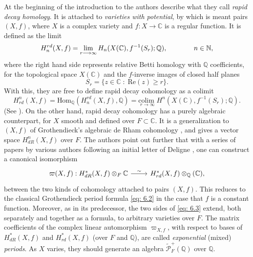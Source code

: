 \documentclass[preprint,12pt, leqno]{elsarticle}
\newcommand{\mQ}{\mathbb{Q}}
\newcommand{\mC}{\mathbb{C}}
\newcommand{\cP}{\mathcal{P}}
\newcommand{\ubf}[1]{\textit{#1}}
\newcommand{\SP}{\mkern70mu }
\numberwithin{equation}{section}
\theoremstyle{named}
\begin{document}
At the beginning of the introduction to \cite{FJ} the authors describe what they call \ubf{rapid decay homology}. It is attached to \ubf{varieties with potential}, by which is meant pairs $(X, f)$, where $X$ is a complex variety and $f:X \longrightarrow \mC$ is a regular function. It is defined as the limit
\begin{equation*}
    H_n^{rd}(X, f) = \lim_{r\longrightarrow\infty} H_n(X(\mC), f^{-1}(S_r); \mQ), \SP n\in \mathbb{N},
\end{equation*}
where the right hand side represents relative Betti homology with $\mQ$ coefficients, for the topological space $X(\mC)$ and the $f$-inverse images of closed half planes
\begin{equation*}
    S_r = \{z\in\mC \;:\; \mbox{Re}(z) \ge r\}.
\end{equation*}
With this, they are free to define rapid decay cohomology as a colimit
\begin{equation*}
    H_{rd}^n(X, f) = \mbox{Hom}_{\mQ}(H_n^{rd}(X, f), \mQ) = \underset{r\longrightarrow\infty}{\mbox{colim }} H^n(X(\mC), f^{-1}(S_r); \mQ).
\end{equation*}
(See \cite[Page 8]{FJ}). On the other hand, rapid decay cohomology has a purely algebraic counterpart, for $X$ smooth and defined over $F\subset\mC$. It is a generalization to $(X, f)$ of Grothendieck's algebraic de Rham cohomology \cite{G}, and gives a vector space $H^n_{dR}(X, f)$ over $F$.
The authors point out further that with a series of papers by various authors following an initial letter of Deligne \cite{N15}, one can construct a canonical isomorphism
\begin{equation}\label{eq: 6.3}
\begin{tikzcd}
    \varpi(X, f): H_{dR}^*(X, f)\otimes_F\mC \ar[r, "\sim"] & H_{rd}^*(X, f)\otimes_{\mQ}(\mC),
\end{tikzcd}
\end{equation}
between the two kinds of cohomology attached to pairs $(X, f)$. This reduces to the classical Grothendieck period formula \eqref{eq: 6.2} in the case that $f$ is a constant function. Moreover, as in its predecessor, the two sides of \eqref{eq: 6.3} extend, both separately and together as a formula, to arbitrary varieties over $F$. The matrix coefficients of the complex linear automorphism $\varpi_{X, f}$, with respect to bases of $H_{dR}^*(X, f)$ and $H_{rd}^*(X, f)$ (over $F$ and $\mQ$), are called \ubf{exponential} (mixed) \ubf{periods}. As $X$ varies, they should generate an algebra $\widetilde{\cP}_F^+(\mQ)$ over $\mQ$.
\end{document}
